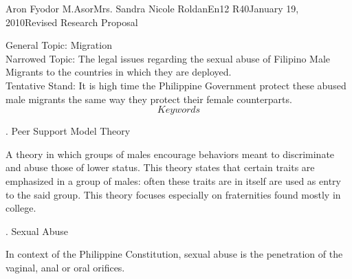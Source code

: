 \documentclass[12pt,letterpaper]{report}
\begin{document}
\begin{mla}{Aron Fyodor M.}{Asor}{Mrs. Sandra Nicole Roldan}{En12 R40}{January 19, 2010}{Revised Research Proposal}

\noindent General Topic: Migration \\
\noindent Narrowed Topic: The legal issues regarding the sexual abuse of Filipino Male Migrants to the countries in which 
they are deployed.\\
\noindent Tentative Stand: It is high time the Philippine Government protect these abused male migrants the same way they protect
their female counterparts. \\

\[Keywords\]

. Peer Support Model Theory

A theory in which groups of males encourage behaviors meant to discriminate and abuse those of lower status. This theory
states that certain traits are emphasized in a group of males: often these traits are in itself are used as entry to the
said group. This theory focuses especially on fraternities found mostly in college.

. Sexual Abuse

In context of the Philippine Constitution, sexual abuse is the penetration of the vaginal, anal or oral orifices. 







\end{mla}
\end{document}
